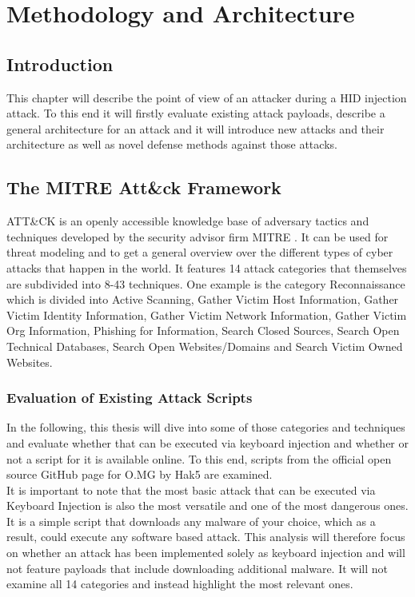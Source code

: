 \chapter{Methodology and Architecture} \label{Methodology}

\section{Introduction}

This chapter will describe the point of view of an attacker during a HID injection attack. To this end it will firstly evaluate existing attack payloads, describe a general architecture for an attack and it will introduce new attacks and their architecture as well as novel defense methods against those attacks. 


\section{The MITRE Att\&ck Framework}

ATT\&CK \cite{MITREATTCK} is an openly accessible knowledge base of adversary tactics and techniques developed by the security advisor firm MITRE \cite{WhoWeAre}. It can be used for threat modeling and to get a general overview over the different types of cyber attacks that happen in the world.
It features 14 attack categories that themselves are subdivided into 8-43 techniques. One example is the category Reconnaissance which is divided into Active Scanning, Gather Victim Host Information, Gather Victim Identity Information, Gather Victim Network Information, Gather Victim Org Information, Phishing for Information, Search Closed Sources, Search Open Technical Databases, Search Open Websites/Domains and Search Victim Owned Websites. 



\subsection{Evaluation of Existing Attack Scripts}

In the following, this thesis will dive into some of those categories and techniques and evaluate whether that can be executed via keyboard injection and whether or not a script for it is available online. To this end, scripts from the official open source GitHub page for O.MG \cite{Hak5Omgpayloads2024} by Hak5 are examined. \\
It is important to note that the most basic attack that can be executed via Keyboard Injection is also the most versatile and one of the most dangerous ones. It is a simple script that downloads any malware of your choice, which as a result, could execute any software based attack.  
This analysis will therefore focus on whether an attack has been implemented solely as keyboard injection and will not feature payloads that include downloading additional malware. It will not examine all 14 categories and instead highlight the most relevant ones. 

